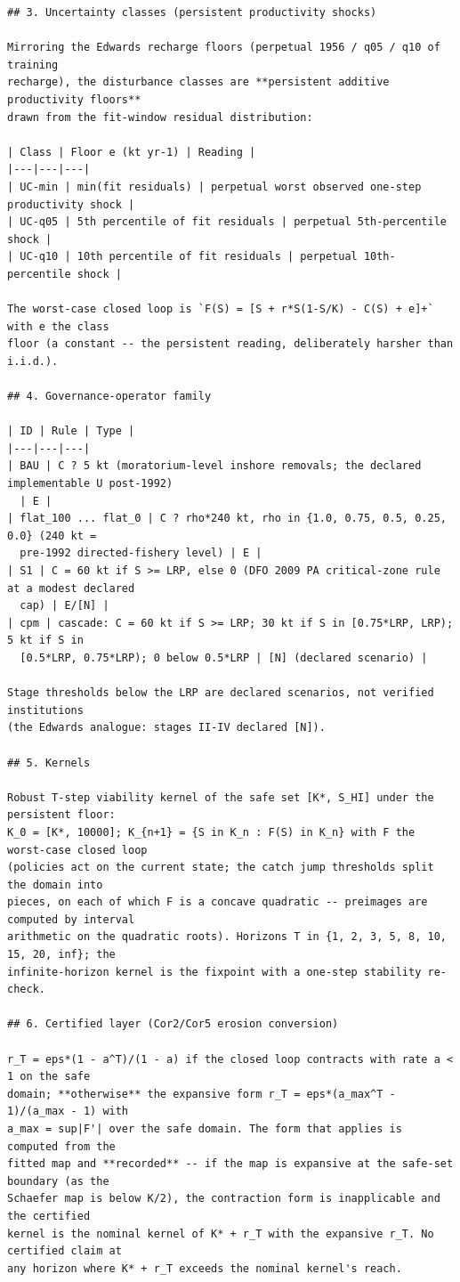 \begin{footnotesize}
\begin{verbatim}
## 3. Uncertainty classes (persistent productivity shocks)

Mirroring the Edwards recharge floors (perpetual 1956 / q05 / q10 of training
recharge), the disturbance classes are **persistent additive productivity floors**
drawn from the fit-window residual distribution:

| Class | Floor e (kt yr-1) | Reading |
|---|---|---|
| UC-min | min(fit residuals) | perpetual worst observed one-step productivity shock |
| UC-q05 | 5th percentile of fit residuals | perpetual 5th-percentile shock |
| UC-q10 | 10th percentile of fit residuals | perpetual 10th-percentile shock |

The worst-case closed loop is `F(S) = [S + r*S(1-S/K) - C(S) + e]+` with e the class
floor (a constant -- the persistent reading, deliberately harsher than i.i.d.).

## 4. Governance-operator family

| ID | Rule | Type |
|---|---|---|
| BAU | C ? 5 kt (moratorium-level inshore removals; the declared implementable U post-1992)
  | E |
| flat_100 ... flat_0 | C ? rho*240 kt, rho in {1.0, 0.75, 0.5, 0.25, 0.0} (240 kt =
  pre-1992 directed-fishery level) | E |
| S1 | C = 60 kt if S >= LRP, else 0 (DFO 2009 PA critical-zone rule at a modest declared
  cap) | E/[N] |
| cpm | cascade: C = 60 kt if S >= LRP; 30 kt if S in [0.75*LRP, LRP); 5 kt if S in
  [0.5*LRP, 0.75*LRP); 0 below 0.5*LRP | [N] (declared scenario) |

Stage thresholds below the LRP are declared scenarios, not verified institutions
(the Edwards analogue: stages II-IV declared [N]).

## 5. Kernels

Robust T-step viability kernel of the safe set [K*, S_HI] under the persistent floor:
K_0 = [K*, 10000]; K_{n+1} = {S in K_n : F(S) in K_n} with F the worst-case closed loop
(policies act on the current state; the catch jump thresholds split the domain into
pieces, on each of which F is a concave quadratic -- preimages are computed by interval
arithmetic on the quadratic roots). Horizons T in {1, 2, 3, 5, 8, 10, 15, 20, inf}; the
infinite-horizon kernel is the fixpoint with a one-step stability re-check.

## 6. Certified layer (Cor2/Cor5 erosion conversion)

r_T = eps*(1 - a^T)/(1 - a) if the closed loop contracts with rate a < 1 on the safe
domain; **otherwise** the expansive form r_T = eps*(a_max^T - 1)/(a_max - 1) with
a_max = sup|F'| over the safe domain. The form that applies is computed from the
fitted map and **recorded** -- if the map is expansive at the safe-set boundary (as the
Schaefer map is below K/2), the contraction form is inapplicable and the certified
kernel is the nominal kernel of K* + r_T with the expansive r_T. No certified claim at
any horizon where K* + r_T exceeds the nominal kernel's reach.


\end{verbatim}
\end{footnotesize}
